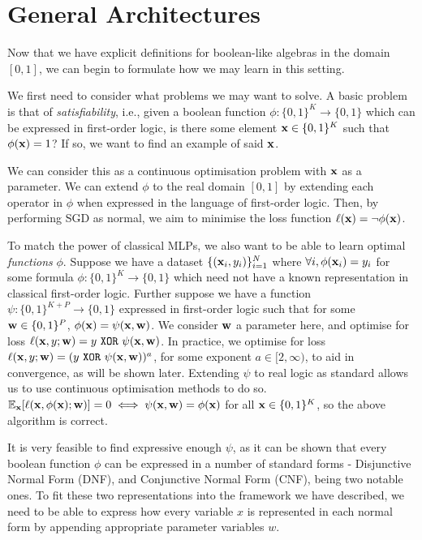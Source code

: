 \section{General Architectures}
\label{section:fuzzyloss}

Now that we have explicit definitions for boolean-like algebras in the domain $[0,1]$, we can begin to formulate how we may learn in this setting.

We first need to consider what problems we may want to solve. A basic problem is that of \textit{satisfiability}, i.e., given a boolean function $\phi : \{0,1\}^K \rightarrow \{0,1\}$ which can be expressed in first-order logic, is there some element $\mathbf{x} \in \{0,1\}^K$ such that $\phi(\mathbf{x}) = 1$? If so, we want to find an example of said $\mathbf{x}$.

We can consider this as a continuous optimisation problem with $\mathbf{x}$ as a parameter. We can extend $\phi$ to the real domain $[0,1]$ by extending each operator in $\phi$ when expressed in the language of first-order logic. Then, by performing SGD as normal, we aim to minimise the loss function $\ell(\mathbf{x}) = \lnot\phi(\mathbf{x})$.

To match the power of classical MLPs, we also want to be able to learn optimal \textit{functions} $\phi$. Suppose we have a dataset $\{(\mathbf{x}_i, y_i)\}_{i=1}^N$ where $\forall i, \phi(\mathbf{x}_i) = y_i$ for some formula $\phi : \{0,1\}^K  \rightarrow \{0,1\}$ which need not have a known representation in classical first-order logic. Further suppose we have a function $\psi : \{0,1\}^{K+P} \rightarrow \{0,1\}$ expressed in first-order logic such that for some $\mathbf{w} \in \{0,1\}^P$, $\phi(\mathbf{x}) = \psi(\mathbf{x}, \mathbf{w})$. We consider $\mathbf{w}$ a parameter here, and optimise for loss $\ell(\mathbf{x}, y; \mathbf{w}) = y \ \texttt{XOR}\  \psi(\mathbf{x}, \mathbf{w})$. In practice, we optimise for loss $\ell(\mathbf{x}, y; \mathbf{w}) = (y \ \texttt{XOR}\  \psi(\mathbf{x}, \mathbf{w}))^a$, for some exponent $a \in [2,\infty)$, to aid in convergence, as will be shown later. Extending $\psi$ to real logic as standard allows us to use continuous optimisation methods to do so. $\mathbb{E}_{\mathbf{x}}[\ell(\mathbf{x}, \phi(\mathbf{x}); \mathbf{w})] = 0 \iff \psi(\mathbf{x}, \mathbf{w}) = \phi(\mathbf{x})$ for all $\mathbf{x} \in \{0,1\}^K$, so the above algorithm is correct.

It is very feasible to find expressive enough $\psi$, as it can be shown that every boolean function $\phi$ can be expressed in a number of standard forms - Disjunctive Normal Form (DNF), and Conjunctive Normal Form (CNF), being two notable ones. To fit these two representations into the framework we have described, we need to be able to express how every variable $x$ is represented in each normal form by appending appropriate parameter variables $w$.

